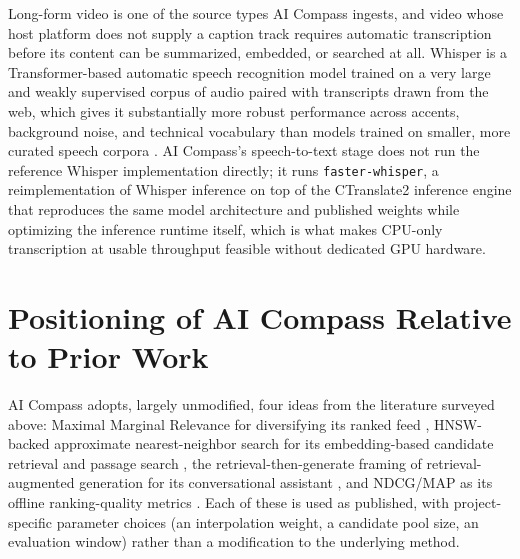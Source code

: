 Long-form video is one of the source types AI Compass ingests, and video whose host platform does not supply a caption track requires automatic transcription before its content can be summarized, embedded, or searched at all. Whisper is a Transformer-based automatic speech recognition model trained on a very large and weakly supervised corpus of audio paired with transcripts drawn from the web, which gives it substantially more robust performance across accents, background noise, and technical vocabulary than models trained on smaller, more curated speech corpora \cite{radford2023whisper}. AI Compass's speech-to-text stage does not run the reference Whisper implementation directly; it runs \texttt{faster-whisper}, a reimplementation of Whisper inference on top of the CTranslate2 inference engine that reproduces the same model architecture and published weights while optimizing the inference runtime itself, which is what makes CPU-only transcription at usable throughput feasible without dedicated GPU hardware.

\section{Positioning of AI Compass Relative to Prior Work}
\label{sec:background-positioning}

AI Compass adopts, largely unmodified, four ideas from the literature surveyed above: Maximal Marginal Relevance for diversifying its ranked feed \cite{carbonell1998mmr}, HNSW-backed approximate nearest-neighbor search for its embedding-based candidate retrieval and passage search \cite{malkov2020hnsw}, the retrieval-then-generate framing of retrieval-augmented generation for its conversational assistant \cite{lewis2020rag}, and NDCG/MAP as its offline ranking-quality metrics \cite{jarvelin2002ndcg,manning2008ir}. Each of these is used as published, with project-specific parameter choices (an interpolation weight, a candidate pool size, an evaluation window) rather than a modification to the underlying method.

